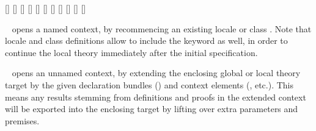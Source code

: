 \begin{isabellebody}
\begin{isamarkuptext}
  \begin{railoutput}
[]
[]
[]
\rail@end
{}
[]
\rail@bar
{}
[]
\rail@endbar
\rail@plus
{}
[]
\rail@endplus
{}[]
\rail@end
{}
[]
[]
[]
[]
\rail@end
\end{railoutput}


  \begin{description}
  
  \item \hyperlink{command.context}{\mbox{}}~ opens a named
  context, by recommencing an existing locale or class .
  Note that locale and class definitions allow to include the
  \hyperlink{keyword.begin}{\mbox{}} keyword as well, in order to continue the local
  theory immediately after the initial specification.

  \item \hyperlink{command.context}{\mbox{}}~ opens
  an unnamed context, by extending the enclosing global or local
  theory target by the given declaration bundles ()
  and context elements (, 
  etc.).  This means any results stemming from definitions and proofs
  in the extended context will be exported into the enclosing target
  by lifting over extra parameters and premises.
  

\end{description}
\end{isamarkuptext}
\end{isabellebody}

